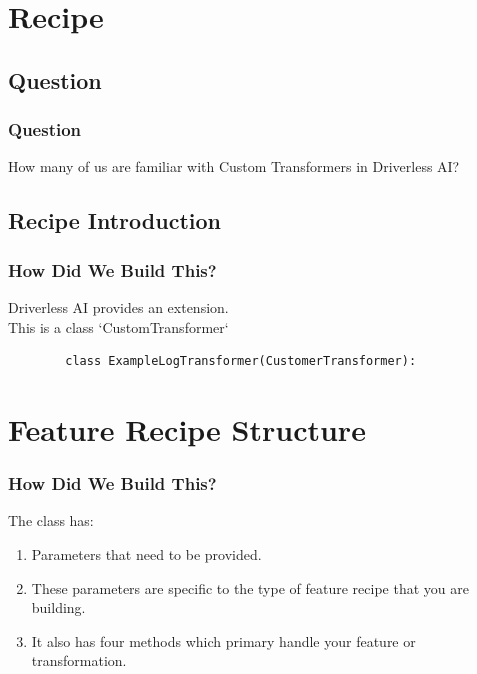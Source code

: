 \documentclass[11pt,
               aspectratio=169,
               hyperref={colorlinks}
               ]{beamer}
\begin{document}
\section{Recipe}
	\subsection{Question}
	\begin{frame}
		\frametitle{Question}
		How many of us are familiar with Custom Transformers in Driverless AI?
	\end{frame}
	\subsection{Recipe Introduction}
	\begin{frame}[fragile]
		\frametitle{How Did We Build This?}
		Driverless AI provides an extension. \\
		This is a class `CustomTransformer`
		\begin{verbatim}
		class ExampleLogTransformer(CustomerTransformer):
		\end{verbatim}
\end{frame}
		\section{Feature Recipe Structure}
	\begin{frame}[fragile]
		\frametitle{How Did We Build This?}
		The class has:
		\begin{enumerate}
			\item Parameters that need to be provided. 
			\item These parameters are specific to the type of feature recipe that you are building. 
			\item It also has four methods which primary handle your feature or transformation. 
		\end{enumerate}
			
\end{frame}
\end{document}
